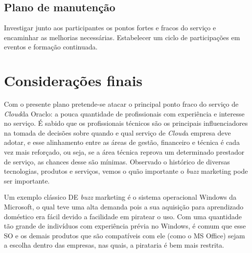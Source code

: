 \documentclass[a4paper]{article}
\newcommand{\C}{\emph{Cloud}}
\begin{document}
\subsection{Plano de manutenção}

Investigar junto aos participantes os pontos fortes e fracos do serviço e encaminhar as melhorias necessárias. Estabelecer um ciclo de participações em eventos e formação continuada.

\section{Considerações finais}

Com o presente plano pretende-se atacar o principal ponto fraco do serviço de \C da Oraclo: a pouca quantidade de profissionais com experiência e interesse no serviço. É sabido que os profissionais técnicos são os principais influenciadores na tomada de decisões sobre quando e qual serviço de \C a empresa deve adotar, e esse alinhamento entre as áreas de gestão, financeiro e técnica é cada vez mais reforçado, ou seja, se a área técnica reprova um determinado prestador de serviço, as chances desse são mínimas. Observado o histórico de diversas tecnologias, produtos e serviços, vemos o quão importante o \emph{buzz} marketing pode ser importante.

Um exemplo clássico DE \emph{buzz} marketing é o sistema operacional Windows da Microsoft, o qual teve uma alta demanda pois a sua aquisição para aprendizado doméstico era fácil devido a facilidade em piratear o uso. Com uma quantidade tão grande de indivíduos com experiência prévia no Windows, é comum que esse SO e os demais produtos que são compatíveis com ele (como o MS Office) sejam a escolha dentro das empresas, nas quais, a pirataria é bem mais restrita.




\end{document}
